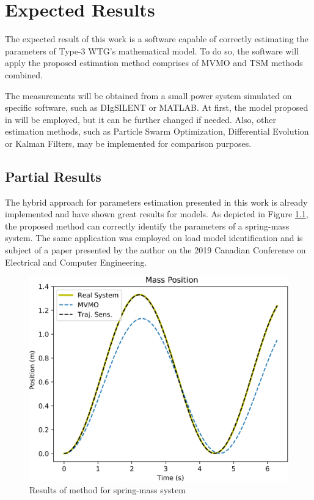 \chapter{Expected Results}

\label{ch: Res}

The expected result of this work is a software capable of correctly estimating the parameters of Type-3 WTG's mathematical model. To do so, the software will apply the proposed estimation method comprises of MVMO and TSM methods combined. 

The measurements will be obtained from a small power system simulated on specific software, such as DIgSILENT or MATLAB. At first, the model proposed in \cite{Erlich2012} will be employed, but it can be further changed if needed. Also, other estimation methods, such as Particle Swarm Optimization, Differential Evolution or Kalman Filters, may be implemented for comparison purposes.

\section{Partial Results}

The hybrid approach for parameters estimation presented in this work is already implemented and have shown great results for models. As depicted in Figure \ref{fig: spring-mass}, the proposed method can correctly identify the parameters of a spring-mass system. The same application was employed on load model identification and is subject of a paper presented by the author on the 2019 Canadian Conference on Electrical and Computer Engineering.

\begin{figure}[h]
	\caption{Results of method for spring-mass system}
	\begin{center}
		\includegraphics[scale=0.5]{Images/SpringMass.eps}
	\end{center}
	\label{fig: spring-mass}
\end{figure}


